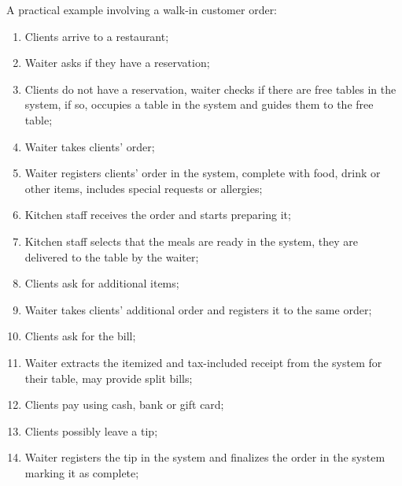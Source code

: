 \documentclass[11pt,a4paper,pdftex]{article}
\begin{document}
A practical example involving a walk-in customer order:
\begin{enumerate}
    \item Clients arrive to a restaurant;

    \item Waiter asks if they have a reservation;
    
    \item Clients do not have a reservation, waiter checks if there are free tables in the system, if so, occupies a table in the system and guides them to the free table;
    
    \item Waiter takes clients' order;
    
    \item Waiter registers clients' order in the system, complete with food, drink or other items, includes special requests or allergies;
    
    \item Kitchen staff receives the order and starts preparing it;
    
    \item Kitchen staff selects that the meals are ready in the system, they are delivered to the table by the waiter;
    
    \item Clients ask for additional items;
    
    \item Waiter takes clients' additional order and registers it to the same order;
    
    \item Clients ask for the bill;
    
    \item Waiter extracts the itemized and tax-included receipt from the system for their table, may provide split bills;
    
    \item Clients pay using cash, bank or gift card;
    
    \item Clients possibly leave a tip;
    
    \item Waiter registers the tip in the system and finalizes the order in the system marking it as complete;
\end{enumerate}
\end{document}
